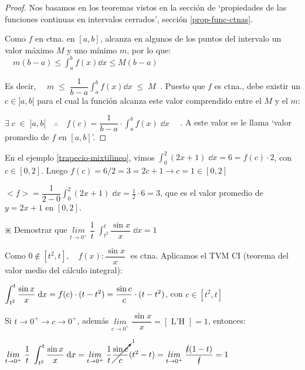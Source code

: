 \begin{proof} 
Nos basamos en los teoremas vistos en la sección de `propiedades de las funciones continuas en intervalos cerrados', sección \ref{prop-func-ctnas}.

Como $f$ en ctna. en $[a,b]$, alcanza en algunos de los puntos del intervalo un valor máximo $M$ y uno mínimo $m$, por lo que:
$\quad m(b-a) \le \displaystyle \int_a^b f(x) \dd x \le M(b-a)$

Es decir, $\quad m \; \le\;  \dfrac {1}{b-a}\displaystyle \int_a^b f(x) \dd x \; \le\;  M \; \;$. Puesto que $f$ es ctna., debe existir un $c\in]a,b[$ para el cual la función alcanza este valor comprendido entre el $M$ y el $m$:

$\exists \; c \; \in \; ]a,b[ \quad  \therefore  \quad  f(c)= \dfrac {1}{b-a }\cdot \displaystyle \int_a^b f(x)\; \dd x \quad $ .  A este valor se le llama `valor promedio de $f$ en $[a,b]$'.
\end{proof}

\begin{ejem}
En el ejemplo \ref{trapecio-mixtilineo}, vimos $\displaystyle \int_0^2 (2x+1) \; \dd x=6=f(c)\cdot 2$, con $c\in [0,2]$. Luego $f(c)=6/2=3 =2c+1 \to c=1 \in [0,2]$

$<f>=\dfrac{1}{2-0} \displaystyle \int_0^2 (2x+1) \; \dd x = \frac 1 2 \cdot 6 = 3 $, que es el valor promedio de $y=2x+1$ en $[0,2]$.
\end{ejem}

\begin{ejem}$\divideontimes$
Demostrar que $\underset{t\to 0^+}{lim}\;{\dfrac 1 t \; \displaystyle \int_{t^2}^t \dfrac {\sin x}{x}\; \dd x }=1$

Como $0\notin [t^2,t],\quad f(x):\dfrac {\sin x}{x}\;$ es ctna. Aplicamos el TVM CI (teorema del valor medio del cálculo integral):

$\displaystyle \displaystyle \int_{t^2}^t \dfrac {\sin x}{x}\; \dd x =f(c)\cdot (t-t^2)= \dfrac {\sin c}{c} 	\cdot (t-t^2)$, con $c\in[t^2,t]$

Si $t\to 0^+ \rightarrow c\to 0^+$, además $\underset{c\to 0^+}{lim}\;{\dfrac {\sin x}{x}}= [\text { L'H }]= 1$, entonces:

$\underset{t\to 0^+}{lim}\;{\dfrac 1 t \; \displaystyle \int_{t^2}^t \dfrac {\sin x}{x}\; \dd x }= \underset {t \to 0^+}{lim}\; {\dfrac 1 t \cancelto{1}{\dfrac {\sin c}{c}} (t^2-t) } =\underset {t\to 0^+}{lim}\; {\dfrac {\cancel{t}(1-t)}{\cancel{t}}}=1$
\end{ejem}


